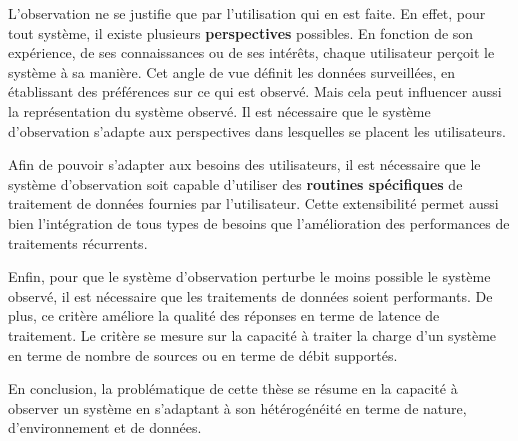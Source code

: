 L'observation ne se justifie que par l'utilisation qui en est faite. En effet, pour tout système, il existe plusieurs \textbf{perspectives} possibles. En fonction de son expérience, de ses connaissances ou de ses intérêts, chaque utilisateur perçoit le système à sa manière. Cet angle de vue définit les données surveillées, en établissant des préférences sur ce qui est observé. Mais cela peut influencer aussi la représentation du système observé. Il est nécessaire que le système d'observation s'adapte aux perspectives dans lesquelles se placent les utilisateurs.

Afin de pouvoir s'adapter aux besoins des utilisateurs, il est nécessaire que le système d'observation soit capable d'utiliser des \textbf{routines spécifiques} de traitement de données fournies par l'utilisateur. Cette extensibilité permet aussi bien l'intégration de tous types de besoins que l'amélioration des performances de traitements récurrents.

Enfin, pour que le système d'observation perturbe le moins possible le système observé, il est nécessaire que les traitements de données soient performants. De plus, ce critère améliore la qualité des réponses en terme de latence de traitement. Le critère se mesure sur la capacité à traiter la charge d'un système en terme de nombre de sources ou en terme de débit supportés.

En conclusion, la problématique de cette thèse se résume en la capacité à observer un système en s'adaptant à son hétérogénéité en terme de nature, d'environnement et de données.